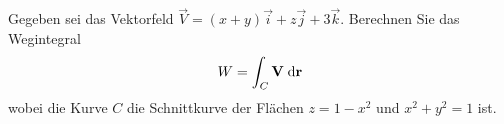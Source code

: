 \begin{atiTask}[
  title = Wegintegrale berechnen
]
Gegeben sei das Vektorfeld $\vec{V}=(x+y)\vec{i}+z\vec{j}+3\vec{k}$. Berechnen Sie das Wegintegral
\begin{equation*}
W=\int_C \mathbf{V} \;\mathrm{d}\mathbf{r}
\end{equation*}
wobei die Kurve $C$ die Schnittkurve der Flächen $z=1-x^2$ und $x^2+y^2=1$ ist.
 
\end{atiTask}

